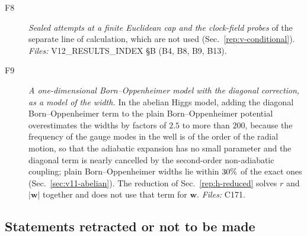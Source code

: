 \begin{description}
\item[F8] \emph{Sealed attempts at a finite Euclidean cap and the clock-field probes} of the separate line of calculation, which are not used (Sec.~\ref{rep:v-conditional}). \emph{Files:} {\small V12\_RESULTS\_INDEX \S B (B4, B8, B9, B13).}
\item[F9] \emph{A one-dimensional Born--Oppenheimer model with the diagonal correction, as a model of the width.} In the abelian Higgs model, adding the diagonal Born--Oppenheimer term to the plain Born--Oppenheimer potential overestimates the widths by factors of $2.5$ to more than $200$, because the frequency of the gauge modes in the well is of the order of the radial motion, so that the adiabatic expansion has no small parameter and the diagonal term is nearly cancelled by the second-order non-adiabatic coupling; plain Born--Oppenheimer widths lie within $30\%$ of the exact ones (Sec.~\ref{sec:v11-abelian}). The reduction of Sec.~\ref{rep:h-reduced} solves $r$ and $|\mathbf w|$ together and does not use that term for $\mathbf w$. \emph{Files:} {\small C171.} %
\end{description}

\subsection{Statements retracted or not to be made}\label{sec:v23-retracted}

